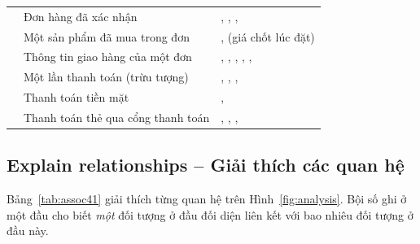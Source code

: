 \documentclass[12pt,a4paper]{article}
\begin{document}
\begin{longtable}{@{}P{2.6cm}P{6.5cm}P{6.8cm}@{}}
\small{} & \small Đơn hàng đã xác nhận & \small{}, , , \\
\small{} & \small Một sản phẩm đã mua trong đơn & \small{},  (giá chốt lúc đặt)\\
\small{} & \small Thông tin giao hàng của một đơn & \small{}, , , , , \\
\small{} & \small Một lần thanh toán (trừu tượng) & \small{}, , , \\
\small{} & \small Thanh toán tiền mặt & \small{}, \\
\small{} & \small Thanh toán thẻ qua cổng thanh toán & \small{}, , , \\
\bottomrule
\end{longtable}

\subsection{Explain relationships -- Giải thích các quan hệ}

Bảng~\ref{tab:assoc41} giải thích từng quan hệ trên Hình~\ref{fig:analysis}. Bội số ghi ở một đầu cho
biết \emph{một} đối tượng ở đầu đối diện liên kết với bao nhiêu đối tượng ở đầu này.
\end{document}
